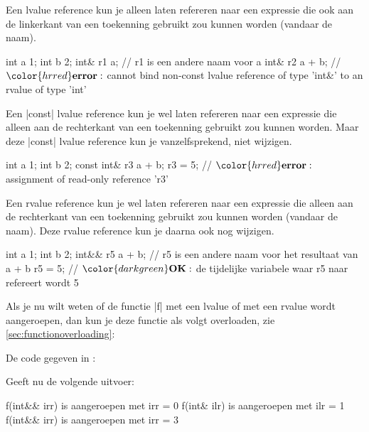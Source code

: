 \begin{cpplstShortInline}
Een lvalue reference kun je alleen laten refereren naar een expressie die ook aan de linkerkant van een toekenning gebruikt zou kunnen worden (vandaar de naam). 

\begin{cpplstfragment}[mathescape=true]
    int a {1};
    int b {2};
    int& r1 {a}; // r1 is een andere naam voor a
    int& r2 {a + b}; // $\color{hrred}\textbf{error}:$ cannot bind non-const lvalue reference of type 'int&' to an rvalue of type 'int'
\end{cpplstfragment}

Een |const| lvalue reference kun je wel laten refereren naar een expressie die alleen aan de rechterkant van een toekenning gebruikt zou kunnen worden.
Maar deze |const| lvalue reference kun je vanzelfsprekend, niet wijzigen.

\begin{cpplstfragment}[mathescape=true]
	int a {1};
    int b {2};
    const int& r3 {a + b};
    r3 = 5; // $\color{hrred}\textbf{error}:$ assignment of read-only reference 'r3'
\end{cpplstfragment}

Een rvalue reference kun je wel laten refereren naar een expressie die alleen aan de rechterkant van een toekenning gebruikt zou kunnen worden (vandaar de naam).
Deze rvalue reference kun je daarna ook nog wijzigen.

\begin{cpplstfragment}[mathescape=true]
	int a {1};
    int b {2};
    int&& r5 {a + b}; // r5 is een andere naam voor het resultaat van a + b
	r5 = 5; // $\color{darkgreen}\textbf{OK}:$ de tijdelijke variabele waar r5 naar refereert wordt 5
\end{cpplstfragment}

Als je nu wilt weten of de functie |f| met een lvalue of met een rvalue wordt aangeroepen, dan kun je deze functie als volgt overloaden, zie \cref{sec:functionoverloading}:


De code gegeven in :


Geeft nu de volgende uitvoer:
\begin{coutput}
f(int&& irr) is aangeroepen met irr = 0
f(int& ilr) is aangeroepen met ilr = 1
f(int&& irr) is aangeroepen met irr = 3
\end{coutput}  


\end{cpplstShortInline}
